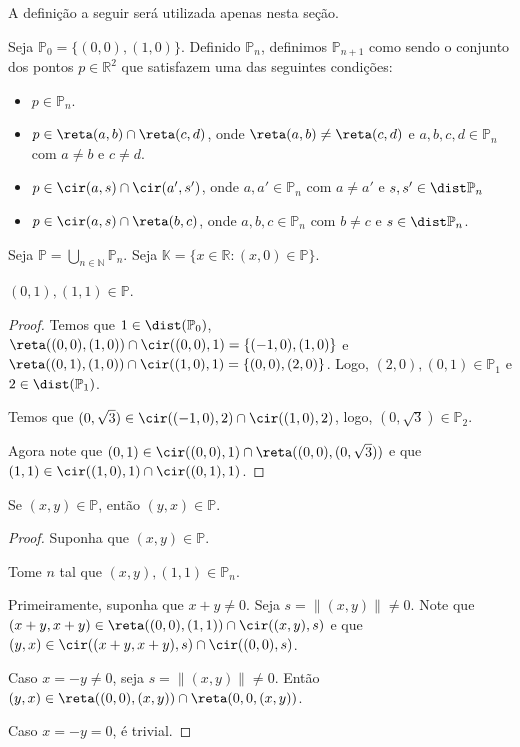 A definição a seguir será utilizada apenas nesta seção.
\begin{definition}
    Seja $\mathbb{P}_0=\{(0, 0), (1, 0)\}$.
    Definido $\mathbb P_n$, definimos $\mathbb{P}_{n+1}$ como sendo o conjunto dos pontos $p \in \mathbb R^2$ que satisfazem uma das seguintes condições:

    \begin{itemize}
        \item $p \in \mathbb{P}_n$.
        \item $p\in \reta(a, b)\cap \reta(c, d)$, onde $\reta(a, b)\neq \reta(c, d)$ e $a, b, c, d \in \mathbb{P}_n$ com $a\neq b$ e $c\neq d$.
        \item $p\in \cir(a, s)\cap \cir(a', s')$, onde $a, a'\in \mathbb{P}_n$ com $a\neq a'$ e $s, s' \in \dist \mathbb P_n$
        \item $p\in \cir(a, s)\cap \reta(b, c)$, onde $a, b, c \in \mathbb{P}_n$ com $b\neq c$ e $s \in \dist \mathbb P_n$.
    \end{itemize}

    Seja $\mathbb P=\bigcup_{n\in \mathbb N} \mathbb P_n$.
    Seja $\mathbb K=\{x \in \mathbb R: (x, 0) \in \mathbb P\}$.
\end{definition}

\begin{lemma}
   $(0, 1), (1, 1) \in \mathbb P$.
\end{lemma}
\begin{proof}
    Temos que $1 \in \dist(\mathbb P_0)$, $\reta((0, 0), (1, 0))\cap \cir((0, 0), 1)=\{(-1, 0), (1, 0)\}$ e $\reta((0, 1), (1, 0))\cap \cir((1, 0), 1)=\{(0, 0), (2, 0)\}$. Logo, $(2, 0), (0, 1)\in \mathbb P_1$ e $2 \in \dist(\mathbb P_1)$.

    Temos que $(0, \sqrt 3) \in \cir((-1, 0), 2)\cap \cir((1, 0), 2)$, logo, $(0, \sqrt 3) \in  \mathbb P_2$.

    Agora note que $(0, 1) \in \cir((0, 0), 1)\cap \reta((0, 0), (0, \sqrt 3))$ e que $(1, 1)\in \cir((1, 0), 1)\cap \cir((0, 1), 1)$.
\end{proof}

\begin{lemma}
   Se $(x, y) \in \mathbb P$, então $(y, x) \in \mathbb P$.
\end{lemma}
\begin{proof}
    Suponha que $(x, y) \in \mathbb P$.
    
    Tome $n$ tal que $(x, y), (1, 1) \in \mathbb P_n$.

    Primeiramente, suponha que $x+y\neq 0$. Seja $s=\|(x, y)\|\neq 0$. Note que $(x+y, x+y)\in \reta((0, 0), (1, 1))\cap \cir((x, y), s)$ e que $(y, x) \in \cir((x+y, x+y), s)\cap \cir((0, 0), s)$.

    Caso $x=-y\neq 0$, seja $s=\|(x, y)\|\neq 0$. Então $(y, x)\in \reta((0, 0), (x, y))\cap \reta(0, 0, (x, y))$.

    Caso $x=-y=0$, é trivial.
\end{proof}

